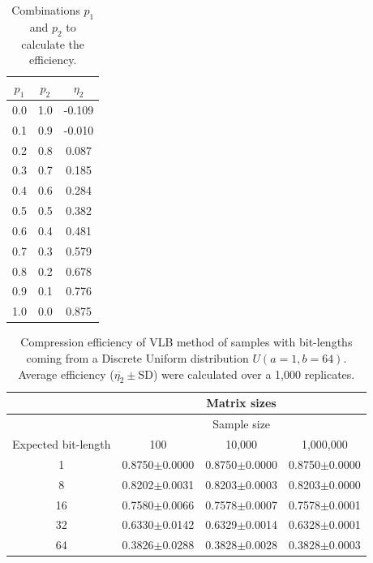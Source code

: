 \documentclass[10pt]{article}
\begin{document}
\begin{table}[h]
 \centering
 \caption{Combinations $p_1$ and $p_2$ to calculate the efficiency.}
 \begin{tabular}{ccc}
  \hline 
  $p_1$  & $p_2$ & $\eta_2$ \\
  \hline
  0.0	&1.0    &-0.109 \\
  0.1	&0.9	&-0.010 \\
  0.2	&0.8	&0.087 \\
  0.3	&0.7	&0.185 \\
  0.4	&0.6	&0.284 \\
  0.5	&0.5	&0.382 \\
  0.6	&0.4	&0.481 \\
  0.7	&0.3	&0.579 \\ 
  0.8	&0.2	&0.678 \\
  0.9	&0.1	&0.776 \\ 
  1.0	&0.0	&0.875 \\
  \hline
 \end{tabular}
 \label{tab:03}
\end{table}

\begin{table}[h]
  \centering
  \caption{Compression efficiency of VLB method of samples with bit-lengths 
coming from a Discrete Uniform distribution $U(a=1,b=64)$. Average efficiency 
($\overline{\eta_2}\pm\textrm{SD}$) were calculated over a 1,000 replicates.}
 \begin{tabular}{cccc}
    \hline
    & &Matrix sizes& \\
    \hline
    & &Sample size & \\
    Expected bit-length & 100 & 10,000 & 1,000,000 \\
    \hline
     1&0.8750$\pm$0.0000& 0.8750$\pm$0.0000&0.8750$\pm$0.0000\\ 
     8&0.8202$\pm$0.0031& 0.8203$\pm$0.0003&0.8203$\pm$0.0000\\ 
     16&0.7580$\pm$0.0066& 0.7578$\pm$0.0007&0.7578$\pm$0.0001\\ 
     32&0.6330$\pm$0.0142& 0.6329$\pm$0.0014&0.6328$\pm$0.0001\\ 
     64&0.3826$\pm$0.0288& 0.3828$\pm$0.0028&0.3828$\pm$0.0003\\ 
    \hline
 \end{tabular}
 \label{tab:04}
\end{table}
\end{document}
